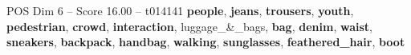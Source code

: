 \begin{textsample}{POS Dim 6 – Score 16.00 – t014141}  \label{ex:f6_pos_019}
\textbf{people}, \textbf{jeans}, \textbf{trousers}, \textbf{youth}, \textbf{pedestrian}, \textbf{crowd}, \textbf{interaction}, luggage\_\&\_bags, \textbf{bag}, \textbf{denim}, \textbf{waist}, \textbf{sneakers}, \textbf{backpack}, \textbf{handbag}, \textbf{walking}, \textbf{sunglasses}, \textbf{feathered\_hair}, \textbf{boot}

\end{textsample}
